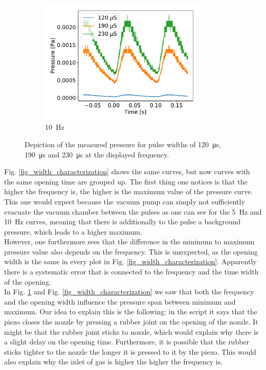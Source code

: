 \documentclass[a4paper,10pt]{article}
\begin{document}
\begin{figure}[H]
\begin{subfigure}[t]{0.45 \textwidth}
    \centering
    \includegraphics[height=6cm]{part1_10_hertz.pdf}
    \caption{\SI{10}{\hertz}}
  \end{subfigure}
  \caption{Depiction of the measured pressure for pulse widths of \SI{120}{\micro \s}, \SI{190}{\micro \s} and \SI{230}{\micro \s} at the displayed frequency. }
  \label{fig_pressure_characterization}
\end{figure}
Fig. \ref{fig_width_characterization} shows the same curves, but now curves with the same opening time are grouped up. The first thing one notices is that the higher the frequency is, the higher is the maximum value of the pressure curve. This one would expect because the vacuum pump can simply not sufficiently evacuate the vacuum chamber between the pulses as one can see for the \SI{5}{\hertz} and \SI{10}{\hertz} curves, meaning that there is additionally to the pulse a background pressure, which leads to a higher maximum. 
\\
However, one furthermore sees that the difference in the minimum to maximum pressure value also depends on the frequency. This is unexpected, as the opening width is the same in every plot in Fig. \ref{fig_width_characterization}. Apparently there is a systematic error that is connected to the frequency and the time width of the opening. %
\\
In Fig. \ref{fig_pressure_characterization} and Fig. \ref{fig_width_characterization} we saw that both the frequency and the opening width influence the pressure span between minimum and maximum. Our idea to explain this is the following: in the script \cite{script} it says that the piezo closes the nozzle by pressing a rubber joint on the opening of the nozzle. It might be that the rubber joint sticks to nozzle, which would explain why there is a slight delay on the opening time. Furthermore, it is possible that the rubber sticks tighter to the nozzle the longer it is pressed to it by the piezo. This would also explain why the inlet of gas is higher the higher the frequency is. 
\end{document}
